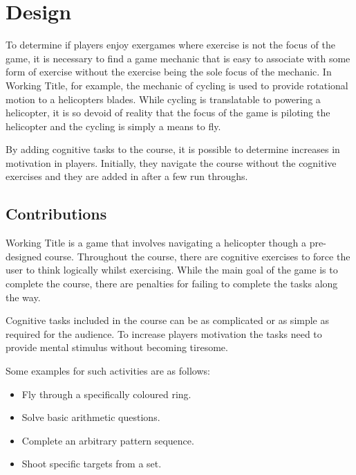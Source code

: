 \documentclass[a4paper, 11pt]{article}
\begin{document}
\clearpage

\section{Design}
\begin{multicols}{2}

To determine if players enjoy exergames where exercise is not the focus of the game, it is necessary to find a game mechanic that is easy to associate with some form of exercise without the exercise being the sole focus of the mechanic. In Working Title, for example, the mechanic of cycling is used to provide rotational motion to a helicopters blades. While cycling is translatable to powering a helicopter, it is so devoid of reality that the focus of the game is piloting the helicopter and the cycling is simply a means to fly.

By adding cognitive tasks to the course, it is possible to determine increases in motivation in players. Initially, they navigate the course without the cognitive exercises and they are added in after a few run throughs.

\subsection{Contributions}

Working Title is a game that involves navigating a helicopter though a pre-designed course. Throughout the course, there are cognitive exercises to force the user to think logically whilst exercising. While the main goal of the game is to complete the course, there are penalties for failing to complete the tasks along the way.

Cognitive tasks included in the course can be as complicated or as simple as required for the audience. To increase players motivation the tasks need to provide mental stimulus without becoming tiresome.

Some examples for such activities are as follows:
\begin{itemize}
	\item Fly through a specifically coloured ring.
	\item Solve basic arithmetic questions.
	\item Complete an arbitrary pattern sequence.
	\item Shoot specific targets from a set.
\end{itemize}

\end{multicols}
\end{document}
